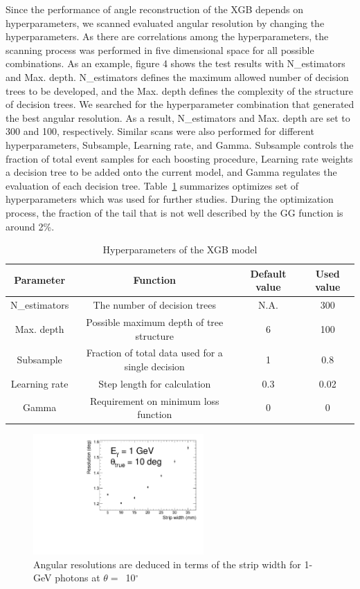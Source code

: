 \documentclass[preprint,12pt,times,a4paper]{elsarticle}
\begin{document}
Since the performance of angle reconstruction of the XGB depends on hyperparameters, we scanned evaluated angular resolution by changing the hyperparameters. As there are correlations among the hyperparameters, the scanning process was performed in five dimensional space for all possible combinations. As an example, figure 4 shows the test results with N\_estimators and Max. depth. N\_estimators defines the maximum allowed number of decision trees to be developed, and the Max. depth defines the complexity of the structure of decision trees. We searched for the hyperparameter combination that generated the best angular resolution. As a result, N\_estimators and Max. depth are set to 300 and 100, respectively. Similar scans were also performed for different hyperparameters, Subsample, Learning rate, and Gamma. Subsample controls the fraction of total event samples for each boosting procedure, Learning rate weights a decision tree to be added onto the current model, and Gamma regulates the evaluation of each decision tree. Table~\ref{tab:XgbPar} summarizes optimizes set of hyperparameters which was used for further studies. During the optimization process, the fraction of the tail that is not well described by the GG function is around 2\%.

\begin{table}[hbt!]{\small
\centering
\caption{Hyperparameters of the XGB model}
\begin{tabular}{cccc}
\hline 
Parameter & Function & Default value & Used value \\ \hline 
N\_estimators & The number of decision trees & N.A. & 300 \\  
Max. depth & Possible maximum depth of tree structure & 6 & 100 \\ 
Subsample & Fraction of total data used for a single decision & 1 & 0.8 \\ 
Learning rate & Step length for calculation & 0.3 & 0.02 \\ 
Gamma & Requirement on minimum loss function & 0 & 0 \\ 
\hline
\end{tabular}
\label{tab:XgbPar}
}\end{table}

\begin{figure}[!hbt]
\centering
\includegraphics[width=0.58\textwidth]{figures/Fig5_width.pdf}
\caption{ Angular resolutions are deduced in terms of the strip width for 1-GeV photons at $\theta=$~10$^{\circ}$ }
\label{fig:angle_reco_width}
\end{figure}
\end{document}
